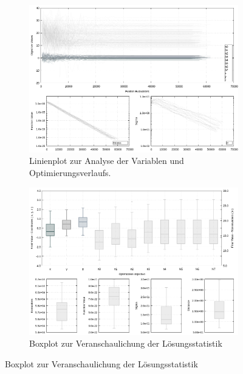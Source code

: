 \begin{landscape}
\begin{figure}[!ht]
\begin{subfigure}[t]{0.45\textheight}
	\end{subfigure}
	\vspace{5mm}
\\
	\centering
	\begin{subfigure}[t]{0.45\textheight}
	     \centering
	     \includegraphics[width=\textwidth]{img/evo/lines4089.png}
	             \caption{Linienplot zur Analyse der Variablen und Optimierungsverlaufs.}
	\end{subfigure}
	\qquad
	\begin{subfigure}[t]{0.45\textheight}
		\centering
	     \includegraphics[width=\textwidth]{img/evo/boxes4089.png}
	     	    \caption{Boxplot zur Veranschaulichung der Lösungsstatistik }
	\end{subfigure}

\end{figure}
\end{landscape}

